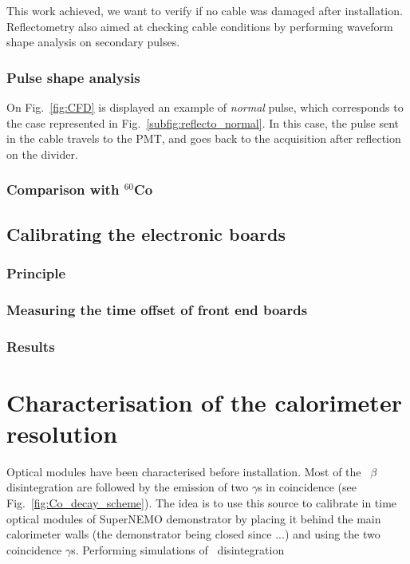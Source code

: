 This work achieved, we want to verify if no cable was damaged after installation.
Reflectometry also aimed at checking cable conditions by performing waveform shape analysis on secondary pulses.

\subsection{Pulse shape analysis}
\label{subsec:pulse_shape}
On Fig.~\ref{fig:CFD} is displayed an example of \emph{normal} pulse, which corresponds to the case represented in Fig.~\ref{subfig:reflecto_normal}.
In this case, the pulse sent in the cable travels to the PMT, and goes back to the acquisition after reflection on the divider.


\subsection{Comparison with $^{60}$Co}

\section{Calibrating the electronic boards}
\label{sec:TimeSynchroFEB}

\subsection{Principle}
\subsection{Measuring the time offset of front end boards}
\subsection{Results}

\chapter{Characterisation of the calorimeter resolution}

Optical modules have been characterised before installation.
Most of the \Co\ $\beta$ disintegration are followed by the emission of two $\gamma$s in coincidence (see Fig.~\ref{fig:Co_decay_scheme}).
The idea is to use this source to calibrate in time optical modules of SuperNEMO demonstrator by placing it behind the main calorimeter walls (the demonstrator being closed since ...) and using the two coincidence $\gamma$s.
Performing simulations of \Co\ disintegration




